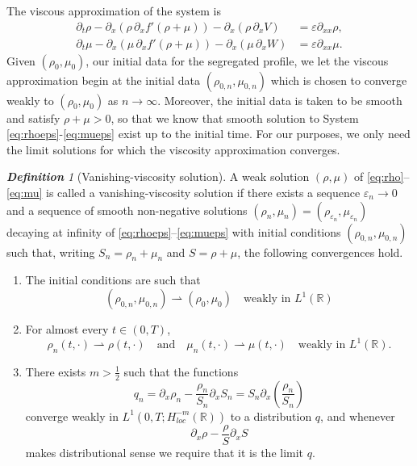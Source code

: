 \documentclass[a4paper,twosided, 11pt]{article}
\newcommand{\eps}{\varepsilon}
\newcommand{\R}{\mathbb{R}}
\theoremstyle{plain}
\theoremstyle{remark}
\newtheorem{definition}[thm]{\bf Definition}
\numberwithin{equation}{section}
\begin{document}
The viscous approximation of the system is
\begin{align}
\partial_t\rho - \partial_x(\rho\,\partial_x f'(\rho+\mu))- \partial_x (\rho\,\partial_x V) &= \eps\partial_{xx}\rho,\label{eq:rhoeps}\\
\partial_t\mu  - \partial_x (\mu\,\partial_x f'(\rho+\mu))- \partial_x (\mu\,\partial_x W) &= \eps\partial_{xx}\mu.\label{eq:mueps}
\end{align} 
Given $(\rho_0,\mu_0)$, our initial data for the segregated profile, we let the viscous approximation begin at the initial data $(\rho_{0,n},\mu_{0,n})$ which is chosen to converge weakly to $(\rho_0,\mu_0)$ as $n \to \infty$.
Moreover, the initial data is taken to be smooth and satisfy $\rho+\mu > 0$, so that we know that smooth solution to System \eqref{eq:rhoeps}-\eqref{eq:mueps} exist up to the initial time.
For our purposes, we only need the limit solutions for which the viscosity approximation converges.
\begin{definition}[Vanishing-viscosity solution]
\label{def:vv}
A weak solution $(\rho,\mu)$ of \eqref{eq:rho}--\eqref{eq:mu} is called a vanishing-viscosity solution if there exists a sequence $\eps_n\to 0$ and a sequence of smooth non-negative solutions $(\rho_n,\mu_n)=(\rho_{\eps_n},\mu_{\eps_n})$ decaying at infinity of \eqref{eq:rhoeps}--\eqref{eq:mueps} with initial conditions $(\rho_{0,n},\mu_{0,n})$ such that, writing $S_n=\rho_n+\mu_n$ and $S=\rho+\mu$, the following convergences hold.
\begin{enumerate}[label=(VV\arabic*)]
\item\label{vv1} The initial conditions are such that
$$
(\rho_{0,n},\mu_{0,n}) \rightharpoonup  (\rho_0,\mu_0) \quad \text{weakly in $L^{1}(\R)$}
$$ 
\item\label{vv2} For almost every $t\in(0,T)$,
$$
\rho_n(t,\cdot)\rightharpoonup \rho(t,\cdot)
\quad\text{and}\quad
\mu_n(t,\cdot)\rightharpoonup \mu(t,\cdot)
\quad\text{weakly in }L^1(\R).
$$

\item\label{vv3} There exists $m>\frac 1 2$ such that the functions
$$
q_n=\partial_x\rho_n-\frac{\rho_n}{S_n}\partial_xS_n
= S_n \partial_x \left(\frac{\rho_n}{S_n}\right)
$$
converge weakly in $L^1(0,T; H^{-m}_{loc}(\R))$ to a distribution $q$, and whenever 
$$
\partial_x\rho-\frac{\rho}{S}\partial_x S
$$
makes distributional sense we require that it is the limit $q$.
\end{enumerate}
\end{definition}
\end{document}

